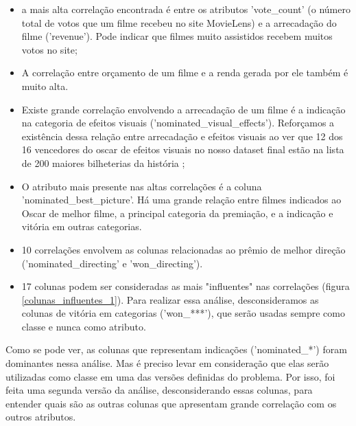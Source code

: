             \begin{itemize}

            \item a mais alta correlação encontrada é entre os atributos 'vote\_count' (o número total de votos que um filme recebeu no site MovieLens) e a arrecadação do filme ('revenue'). Pode indicar que filmes muito assistidos recebem muitos votos no site;
            
            \item A correlação entre orçamento de um filme e a renda gerada por ele também é muito alta.

            \item Existe grande correlação envolvendo a arrecadação de um filme é a indicação na categoria de efeitos visuais ('nominated\_visual\_effects'). Reforçamos a existência dessa relação entre arrecadação e efeitos visuais ao ver que 12 dos 16 vencedores do oscar de efeitos visuais no nosso dataset final estão na lista de 200 maiores bilheterias da história \cite{mojo2021};

            \item O atributo mais presente nas altas correlações é a coluna 'nominated\_best\_picture'. Há uma grande relação entre filmes indicados ao Oscar de melhor filme, a principal categoria da premiação, e a indicação e vitória em outras categorias.

            \item 10 correlações envolvem as colunas relacionadas ao prêmio de melhor direção ('nominated\_directing' e 'won\_directing').

            \item 17 colunas podem ser consideradas as mais "influentes" nas correlações (figura \ref{colunas_influentes_1}). Para realizar essa análise, desconsideramos as colunas de vitória em categorias ('won\_***'), que serão usadas sempre como classe e nunca como atributo.
            
            \end{itemize}
            
            Como se pode ver, as colunas que representam indicações ('nominated\_*') foram dominantes nessa análise. Mas é preciso levar em consideração que elas serão utilizadas como classe em uma das versões definidas do problema. Por isso, foi feita uma segunda versão da análise, desconsiderando essas colunas, para entender quais são as outras colunas que apresentam grande correlação com os outros atributos.
            
